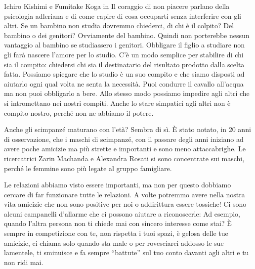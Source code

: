 \documentclass[12pt]{book} %
\begin{document}
\bigskip

Ichiro Kishimi e Fumitake Koga in Il coraggio di non piacere parlano
della psicologia adleriana e di come capire di cosa occuparti senza interferire con gli altri. Se un bambino non studia
dovremmo chiederci, di chi è il colpito? Del bambino o dei genitori? Ovviamente del bambino. Quindi non porterebbe
nessun vantaggio al bambino se studiassero i genitori. Obbligare il figlio a studiare non gli farà nascere l'amore per
lo studio. C'è un modo semplice per stabilire di chi sia il compito: chiedersi chi sia il
destinatario del risultato prodotto dalla scelta fatta. Possiamo spiegare che lo studio è un suo compito e che siamo
disposti ad aiutarlo ogni qual volta ne senta la necessità.
\newline
\newline
Puoi condurre il cavallo all'acqua ma non puoi obbligarlo a bere.
\newline
\newline
Allo stesso modo possiamo impedire agli altri che si intromettano nei nostri compiti. Anche lo stare simpatici agli
altri non è compito nostro, perché non ne abbiamo il potere.


\bigskip
\begin{mdframed}[linewidth=1pt]
Anche gli scimpanzé {\textquotedbl}maturano{\textquotedbl} con l'età? Sembra di sì. È stato notato, in 20 anni di
osservazione, che i maschi di scimpanzé, con il passare degli anni iniziano ad avere poche amicizie ma più strette e
importanti e sono meno attaccabrighe. Le ricercatrici Zarin Machanda e Alexandra Rosati si sono concentrate sui maschi,
perché le femmine sono più legate al gruppo famigliare. 
\end{mdframed}

\bigskip

Le relazioni abbiamo visto essere importanti, ma non per questo dobbiamo cercare di far funzionare tutte le relazioni. A
volte potremmo avere nella nostra vita amicizie che non sono positive per noi o addirittura essere tossiche! Ci sono
alcuni campanelli d'allarme che ci possono aiutare a riconoscerle: Ad esempio, quando
l'altra persona non ti chiede mai con sincero interesse come stai? È sempre in competizione con
te, non rispetta i tuoi spazi, è gelosa delle tue amicizie, ci chiama solo quando sta male o per rovesciarci addosso le
sue lamentele, ti sminuisce e fa sempre “battute” sul tuo conto davanti agli altri e tu non ridi
mai. 
\end{document}
